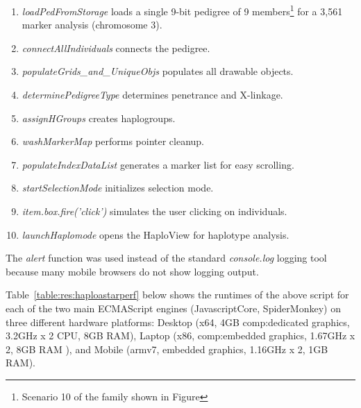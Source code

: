 \begin{spacing}{1.1}
\begin{enumerate}
\item{\textit{loadPedFromStorage} loads a single 9-bit pedigree of 9 members\footnote{Scenario 10 of the family shown in Figure} for a 3,561 marker analysis (chromosome 3).}
\item{\textit{connectAllIndividuals} connects the pedigree.}
\item{\textit{populateGrids\_and\_UniqueObjs} populates all drawable objects.}
\item{\textit{determinePedigreeType} determines penetrance and X-linkage.}
\item{\textit{assignHGroups} creates haplogroups.}
\item{\textit{washMarkerMap} performs pointer cleanup.}
\item{\textit{populateIndexDataList} generates a marker list for easy scrolling.}
\item{\textit{startSelectionMode} initializes selection mode.}
\item{\textit{item.box.fire('click')} simulates the user clicking on individuals.}
\item{\textit{launchHaplomode} opens the HaploView for haplotype analysis.}
\end{enumerate}
\end{spacing}

The \textit{alert} function was used instead of the standard \textit{console.log} logging tool because many mobile browsers do not show logging output. 

Table~\ref{table:res:haploastarperf} below shows the runtimes of the above script for each of the two main ECMAScript engines (JavascriptCore, SpiderMonkey) on three different hardware platforms: Desktop (x64, 4GB \gls{comp:dedicated graphics}, 3.2GHz x 2 CPU, 8GB RAM), Laptop (x86, \gls{comp:embedded graphics}, 1.67GHz x 2, 8GB RAM ), and Mobile (armv7, embedded graphics, 1.16GHz x 2, 1GB RAM).


